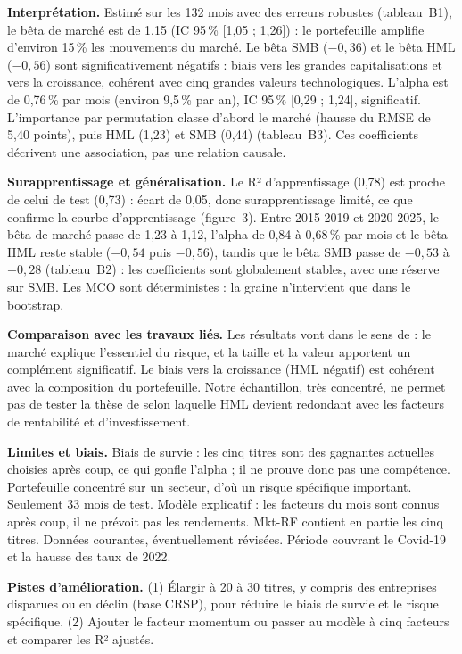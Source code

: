 \documentclass[11pt,a4paper]{article}
\newcommand{\pc}{\,\%}
\newcommand{\mkt}{Mkt-RF}
\begin{document}
\textbf{Interprétation.} Estimé sur les 132 mois avec des erreurs robustes (tableau~B1), le bêta de marché est de 1,15 (IC 95\,\% [1,05 ; 1,26]) : le portefeuille amplifie d'environ 15\,\% les mouvements du marché. Le bêta SMB ($-0{,}36$) et le bêta HML ($-0{,}56$) sont significativement négatifs : biais vers les grandes capitalisations et vers la croissance, cohérent avec cinq grandes valeurs technologiques. L'alpha est de 0,76\pc{} par mois (environ 9,5\pc{} par an), IC 95\,\% [0,29 ; 1,24], significatif. L'importance par permutation classe d'abord le marché (hausse du RMSE de 5,40 points), puis HML (1,23) et SMB (0,44) (tableau~B3). Ces coefficients décrivent une association, pas une relation causale.

\textbf{Surapprentissage et généralisation.} Le R² d'apprentissage (0,78) est proche de celui de test (0,73) : écart de 0,05, donc surapprentissage limité, ce que confirme la courbe d'apprentissage (figure~3). Entre 2015-2019 et 2020-2025, le bêta de marché passe de 1,23 à 1,12, l'alpha de 0,84 à 0,68\pc{} par mois et le bêta HML reste stable ($-0{,}54$ puis $-0{,}56$), tandis que le bêta SMB passe de $-0{,}53$ à $-0{,}28$ (tableau~B2) : les coefficients sont globalement stables, avec une réserve sur SMB. Les MCO sont déterministes : la graine n'intervient que dans le bootstrap.

\textbf{Comparaison avec les travaux liés.} Les résultats vont dans le sens de \cite{ff93} : le marché explique l'essentiel du risque, et la taille et la valeur apportent un complément significatif. Le biais vers la croissance (HML négatif) est cohérent avec la composition du portefeuille. Notre échantillon, très concentré, ne permet pas de tester la thèse de \cite{ff15} selon laquelle HML devient redondant avec les facteurs de rentabilité et d'investissement.

\textbf{Limites et biais.} Biais de survie : les cinq titres sont des gagnantes actuelles choisies après coup, ce qui gonfle l'alpha ; il ne prouve donc pas une compétence. Portefeuille concentré sur un secteur, d'où un risque spécifique important. Seulement 33 mois de test. Modèle explicatif : les facteurs du mois sont connus après coup, il ne prévoit pas les rendements. \mkt{} contient en partie les cinq titres. Données courantes, éventuellement révisées. Période couvrant le Covid-19 et la hausse des taux de 2022.

\textbf{Pistes d'amélioration.} (1) Élargir à 20 à 30 titres, y compris des entreprises disparues ou en déclin (base CRSP), pour réduire le biais de survie et le risque spécifique. (2) Ajouter le facteur momentum ou passer au modèle à cinq facteurs \cite{ff15} et comparer les R² ajustés.
\end{document}
